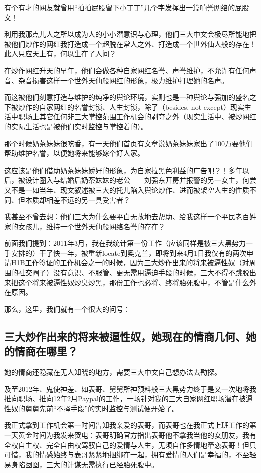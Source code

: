 \documentclass[9pt, b5paper]{article}
\begin{document}
有个有才的网友就曾用“拍拍屁股留下小丁丁”几个字发挥出一篇响誉网络的屁股文！

利用我那点儿人之所以成为人的小小潜意识与心理，他们三大中文会极尽所能地把被他们炒作的网红我打造成一个超脱在常人之外、打造成一个世外仙人般的存在！此人只应天上有，何以生在了人间？

在炒作网红升天的早年，他们会做各种自家网红名誉、声誉维护，不允许有任何声音、杂音损害这样一个世外天仙般网红的形象，极力维护打理她的名声。

而这被他们刻意打造与维护的纯净的舆论环境，实则也是一种舆论与强加的盛名之下被炒作的自家网红的名誉封锁、人生封锁，除了（besides, not except）现实生活中职场上其它任何非三大掌控范围工作机会的剥夺之外（现实生活中、被炒网红的实际生活也是被他们实时监控与掌控着的）。

那个时候奶茶妹妹很吃香，有一天他们首页有文章说奶茶妹妹家出了100万要他们帮助维护名誉，以便她将来能够嫁个好人家。

这应该是他们借助奶茶妹妹娇好的形象，为自家拉黑色利益的广告吧？！多年以后，被设计圈入与结婚后奶茶妹妹的老公——刘强东开房并报警的另一女主，何尝又不是一如当年、现文叙述被三大的托儿陷入舆论炒作、进而被架空人生的性质不同、但本质却相差不远的另一具受害者？

我甚至不曾去想：他们三大为什么要平白无故地去帮助、给我这样一个平民老百姓家的女孩儿，维持一个世外天仙般网络名誉的存在？

前面我们提到：2011年3月，我在我统计第一份工作（应该同样是被三大黑势力一手安排的）干了快一年，被重新locate到奥克兰，即将到来4月1日我仅有的两次申请H1B工作签证的工作机会之一的时候，因为三大炒作出来的将来被逼性奴（对周围的社交圈子）没有意识、不服管、更无需用逼迫手段的时候，三大不得不跳脱出来把这个将来被逼性奴炒臭炒黑，那份工作也必将、终将胎死腹中，不管是什么外在原因。

那么，这里，我们就有一个很大的问号：

\subsection{三大炒作出来的将来被逼性奴，她现在的情商几何、她的情商在哪里？}
\label{sec:orgfb62476}

她的情商还隐藏在无人知晓的地方，需要三大中文自己想办法去勘探。

及至2012年、鬼使神差、如表哥、舅舅所神预料般三大黑势力终于是又一次地将我推向职场、推向12年2月Paypal的工作，一场针对我的三大自家网红职场潜在被逼性奴的舅舅先前“不择手段”的实时监控与测试便开始了。

我正式拿到工作机会第一时间告知我亲爱的表哥，而表哥也在我正式上班工作的第一天黄金时间为我发来贺电：表哥明确官方指出表哥他不拿我当他的女朋友，我有全权自主权、完全自由权驾驭自己的爱情与人生，无须自作多情地牵恋表哥！但只可惜，我的情感始终与表哥紧紧地捆绑在一起，拥有爱情的人们是幸福的，不至轻易身陷囫囵，三大的计谋无需执行已经胎死腹中。
\end{document}
